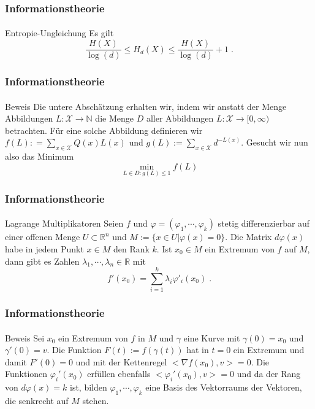 \documentclass{beamer}
\begin{document}
\begin{frame}
    \frametitle{Informationstheorie}
\framesubtitle{}

\begin{block}{Entropie-Ungleichung}
Es gilt
$$ \frac{H(X)}{\log(d)} \leq H_d(X) \leq \frac{H(X)}{\log(d)} +1 \; .$$
\end{block}

 \end{frame}

\begin{frame}
    \frametitle{Informationstheorie}
\framesubtitle{}

\begin{block}{Beweis}
Die untere Abschätzung erhalten wir, indem wir  anstatt der Menge Abbildungen $L: \mathcal{X} \to \mathbb{N}$ die Menge $D$ aller 
Abbildungen $L: \mathcal{X} \to [0, \infty)$ betrachten. Für eine solche Abbildung definieren wir $f(L): = \sum_{x \in \mathcal{X}} Q(x) L(x)$ und 
$g(L):= \sum_{x \in \mathcal{X}} d^{-L(x)}$. Gesucht wir nun also das Minimum
$$ \min_{L \in D : g(L) \leq 1} f(L)$$

\end{block}

 \end{frame}


\begin{frame}
    \frametitle{Informationstheorie}
\framesubtitle{}

\begin{block}{Lagrange Multiplikatoren}
Seien $f$ und $\varphi = (\varphi_1, \cdots , \varphi_k)$ stetig differenzierbar auf einer offenen Menge $U \subset \mathbb{R}^n$ und
 $M := \{  x \in U | \varphi(x) = 0 \}$.
Die Matrix $d \varphi(x)$ habe in jedem Punkt $x \in M$ den Rank $k$. Ist $x_0 \in M$ ein Extremum von $f$ auf $M$, dann gibt es Zahlen $\lambda_1, \cdots , \lambda_n \in \mathbb{R}$ mit
$$ f'(x_0) = \sum_{i= 1}^k \lambda_i \varphi'_i(x_0) \; .$$ 
\end{block}

 \end{frame}



\begin{frame}
    \frametitle{Informationstheorie}
\framesubtitle{}

\begin{block}{Beweis}
Sei $x_0$ ein Extremum von $f$ in $M$ und $\gamma$ eine Kurve mit $\gamma(0)= x_0$ und $\gamma'(0) = v$.
Die Funktion $F(t) := f(\gamma(t))$ hat in $t= 0$ ein Extremum und damit $F'(0) = 0$ und mit der Kettenregel $<\nabla f(x_0), v> = 0$.
Die Funktionen $\varphi_i'(x_0)$ erfüllen ebenfalls $<\varphi_i' (x_0),v> = 0$ und da der Rang von $d \varphi(x)= k$ ist, bilden  $\varphi_1, \cdots , \varphi_k$ eine Basis des Vektorraums der Vektoren, die senkrecht auf $M$ stehen.
\end{block}

 \end{frame}
\end{document}

